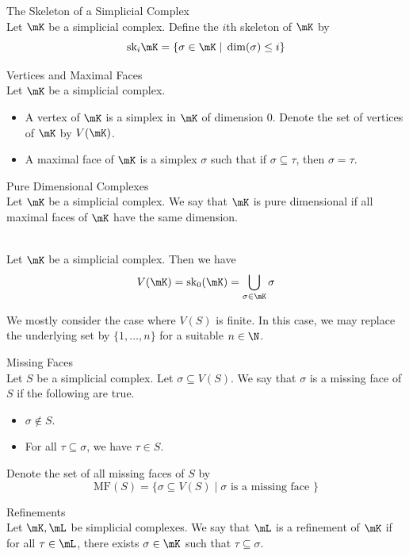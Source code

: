 \documentclass[a4paper]{article}
\begin{document}
\begin{defn}{The Skeleton of a Simplicial Complex}{}\\
Let $\mK$ be a simplicial complex. Define the $i$th skeleton of $\mK$ by $$\text{sk}_i\mK=\{\sigma\in\mK\;|\;\dim(\sigma)\leq i\}$$
\end{defn}

\begin{defn}{Vertices and Maximal Faces}{}\\
Let $\mK$ be a simplicial complex. 
\begin{itemize}
\item A vertex of $\mK$ is a simplex in $\mK$ of dimension $0$. Denote the set of vertices of $\mK$ by $V(\mK)$. 
\item A maximal face of $\mK$ is a simplex $\sigma$ such that if $\sigma\subseteq\tau$, then $\sigma=\tau$. 
\end{itemize}
\end{defn}

\begin{defn}{Pure Dimensional Complexes}{}\\
Let $\mK$ be a simplicial complex. We say that $\mK$ is pure dimensional if all maximal faces of $\mK$ have the same dimension. 
\end{defn}

\begin{lmm}{}{}\\
Let $\mK$ be a simplicial complex. Then we have $$V(\mK)=\text{sk}_0(\mK)=\bigcup_{\sigma\in\mK}\sigma$$
\end{lmm}

We mostly consider the case where $V(S)$ is finite. In this case, we may replace the underlying set by $\{1,\dots,n\}$ for a suitable $n\in\N$. 

\begin{defn}{Missing Faces}{}\\
Let $S$ be a simplicial complex. Let $\sigma\subseteq V(S)$. We say that $\sigma$ is a missing face of $S$ if the following are true. 
\begin{itemize}
\item $\sigma\notin S$. 
\item For all $\tau\subseteq\sigma$, we have $\tau\in S$. 
\end{itemize}
Denote the set of all missing faces of $S$ by $$\text{MF}(S)=\{\sigma\subseteq V(S)\;|\;\sigma\text{ is a missing face }\}$$
\end{defn}

\begin{defn}{Refinements}{}\\
Let $\mK,\mL$ be simplicial complexes. We say that $\mL$ is a refinement of $\mK$ if for all $\tau\in\mL$, there exists $\sigma\in\mK$ such that $\tau\subseteq\sigma$. 
\end{defn}
\end{document}
